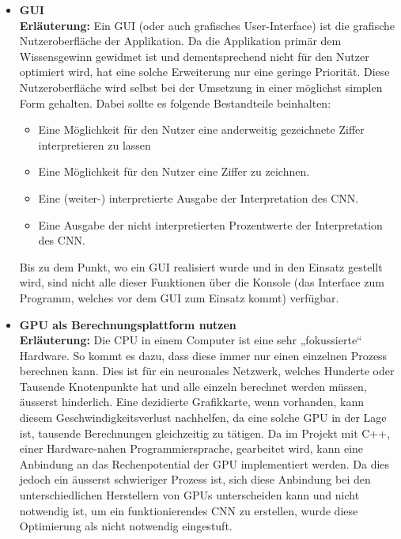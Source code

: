 \begin{itemize}
	\item \textbf{GUI}
	\\
	\textbf{Erläuterung:}
	Ein GUI (oder auch grafisches User-Interface) ist die grafische Nutzeroberfläche der Applikation. Da die Applikation primär dem Wissensgewinn gewidmet ist und dementsprechend nicht für den Nutzer optimiert wird, hat eine solche Erweiterung nur eine geringe Priorität. Diese Nutzeroberfläche wird selbst bei der Umsetzung in einer möglichst simplen Form gehalten. Dabei sollte es folgende Bestandteile beinhalten:
	\begin{itemize}
		\item Eine Möglichkeit für den Nutzer eine anderweitig gezeichnete Ziffer interpretieren zu lassen
		\item Eine Möglichkeit für den Nutzer eine Ziffer zu zeichnen.
		\item Eine (weiter-) interpretierte Ausgabe der Interpretation des CNN.
		\item Eine Ausgabe der nicht interpretierten Prozentwerte der Interpretation des CNN.
	\end{itemize}
	Bis zu dem Punkt, wo ein GUI realisiert wurde und in den Einsatz gestellt wird, sind nicht alle dieser Funktionen über die Konsole (das Interface zum Programm, welches vor dem GUI zum Einsatz kommt) verfügbar.
	
	\item \textbf{GPU als Berechnungsplattform nutzen}
	\\
	\textbf{Erläuterung:}
	Die CPU in einem Computer ist eine sehr „fokussierte“ Hardware. So kommt es dazu, dass diese immer nur einen einzelnen Prozess berechnen kann. Dies ist für ein neuronales Netzwerk, welches Hunderte oder Tausende Knotenpunkte hat und alle einzeln berechnet werden müssen, äusserst hinderlich. Eine dezidierte Grafikkarte, wenn vorhanden, kann diesem Geschwindigkeitsverlust nachhelfen, da eine solche GPU in der Lage ist, tausende Berechnungen gleichzeitig zu tätigen.
	Da im Projekt mit C++, einer Hardware-nahen Programmiersprache, gearbeitet wird, kann eine Anbindung an das Rechenpotential der GPU implementiert werden. Da dies jedoch ein äusserst schwieriger Prozess ist, sich diese Anbindung bei den unterschiedlichen Herstellern von GPUs unterscheiden kann und nicht notwendig ist, um ein funktionierendes CNN zu erstellen, wurde diese Optimierung als nicht notwendig eingestuft.
\end{itemize}


